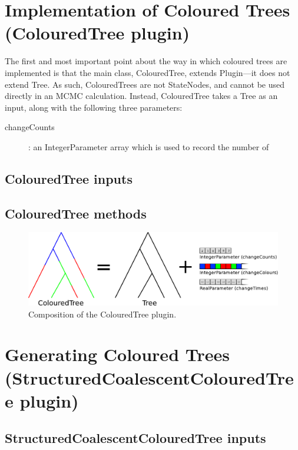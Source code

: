 \documentclass[a4paper,11pt]{paper}
\newcommand{\class}[1]{\textsf{#1}}
\begin{document}
\section{Implementation of Coloured Trees (ColouredTree plugin)}

The first and most important point about the way in which coloured
trees are implemented is that the main class, \class{ColouredTree},
extends \class{Plugin}---it does not extend \class{Tree}.  As such,
\class{ColouredTree}s are not \class{StateNodes}, and cannot be used
directly in an MCMC calculation.  Instead, \class{ColouredTree} takes
a \class{Tree} as an input, along with the following three parameters:
\begin{description}
	\item[\class{changeCounts}]: an \class{IntegerParameter} array which
		is used to record the number of 
\end{description}

\subsection{ColouredTree inputs}

\subsection{ColouredTree methods}

\begin{figure}
	\centering
	\includegraphics[width=\textwidth]{treeComposition.pdf}
	\caption{Composition of the \class{ColouredTree} plugin.}
\end{figure}

\section{Generating Coloured Trees (StructuredCoalescentColouredTree plugin)}

\subsection{StructuredCoalescentColouredTree inputs}
\end{document}
